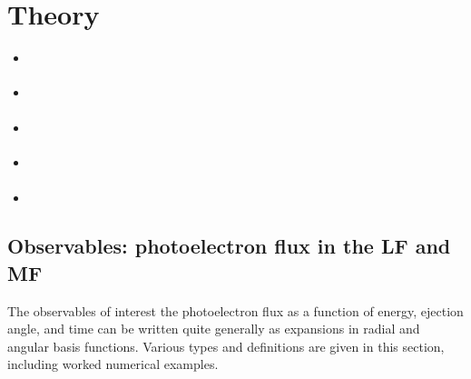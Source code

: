 \documentclass[letterpaper,table,10pt,english]{jupyterBook}
\begin{document}
\chapter{Theory}
\label{\detokenize{part1/theory_101122:theory}}\label{\detokenize{part1/theory_101122:chpt-theory}}\label{\detokenize{part1/theory_101122::doc}}\begin{itemize}
\item {} 
\sphinxAtStartPar
{\hyperref[\detokenize{part1/theory_observables_intro_211122::doc}]{}}

\item {} 
\sphinxAtStartPar
{\hyperref[\detokenize{part1/theory_photoionization_dynamics_191122::doc}]{}}

\item {} 
\sphinxAtStartPar
{\hyperref[\detokenize{part1/theory_tensor_formalism_201122::doc}]{}}

\item {} 
\sphinxAtStartPar
{\hyperref[\detokenize{part1/theory_density_matrices_310123::doc}]{}}

\item {} 
\sphinxAtStartPar
{\hyperref[\detokenize{part1/theory_info_content_221122::doc}]{}}

\end{itemize}

\sphinxstepscope


\section{Observables: photoelectron flux in the LF and MF}
\label{\detokenize{part1/theory_observables_intro_211122:observables-photoelectron-flux-in-the-lf-and-mf}}\label{\detokenize{part1/theory_observables_intro_211122:sect-theory-observables}}\label{\detokenize{part1/theory_observables_intro_211122::doc}}
\sphinxAtStartPar
The observables of interest \sphinxhyphen{} the photoelectron flux as a function of energy, ejection angle, and time \sphinxhyphen{} can be written quite generally as expansions in radial and angular basis functions. Various types and definitions are given in this section, including worked numerical examples.
\end{document}

